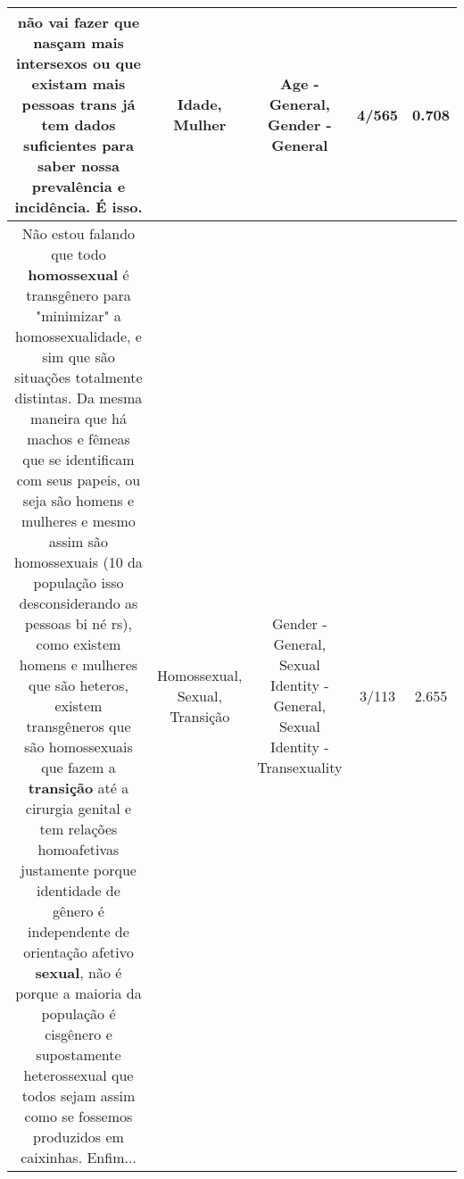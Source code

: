 \documentclass[11pt]{article}
\newlength\mylength
\begin{document}
\begin{center}
\begin{longtable}{|C{.65\mylength}|C{.30\mylength}|C{.12\mylength}|C{.12\mylength}|C{.12\mylength}|}
não vai fazer que nasçam mais intersexos ou que existam mais pessoas trans já tem dados suficientes para saber nossa prevalência e incidência. É isso.\normalsize   & Idade, Mulher & Age - General, Gender - General & 4/565 & 0.708 \\  \hline
  \small Não estou falando que todo \textbf{homossexual} é transgênero para "minimizar" a homossexualidade, e sim que são situações totalmente distintas. Da mesma maneira que há machos e fêmeas que se identificam com seus papeis, ou seja são homens e mulheres e mesmo assim são homossexuais (10 da população isso desconsiderando as pessoas bi né rs), como existem homens e mulheres que são heteros, existem transgêneros que são homossexuais que fazem a \textbf{transição} até a cirurgia genital e tem relações homoafetivas justamente porque identidade de gênero é independente de orientação afetivo \textbf{sexual}, não é porque a maioria da população é cisgênero e supostamente heterossexual que todos sejam assim como se fossemos produzidos em caixinhas. Enfim...\normalsize   & Homossexual, Sexual, Transição & Gender - General, Sexual Identity - General, Sexual Identity - Transexuality & 3/113 & 2.655 \\  \hline

\end{longtable}
\end{center}
\end{document}
